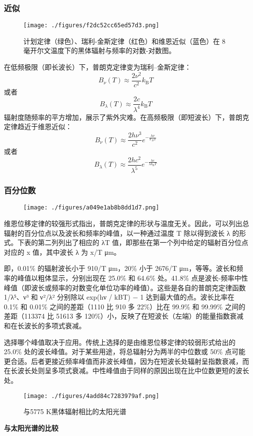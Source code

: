 \subsubsection{近似}
\begin{figure}[ht]
\centering
\texttt{[image: ./figures/f2dc52cc65ed57d3.png]}
\caption{计划定律（绿色）、瑞利-金斯定律（红色）和维恩近似（蓝色）在 8 毫开尔文温度下的黑体辐射与频率的对数-对数图。} \label{fig_HTFS_6}
\end{figure}
在低频极限（即长波长）下，普朗克定律变为瑞利–金斯定律：
\[
B_\nu (T) \approx \frac{2 \nu^2}{c^2} k_{\mathrm{B}} T~
\]
或者
\[
B_\lambda (T) \approx \frac{2c}{\lambda^4} k_{\mathrm{B}} T~
\]
辐射度随频率的平方增加，展示了紫外灾难。在高频极限（即短波长）下，普朗克定律趋近于维恩近似：
\[
B_\nu (T) \approx \frac{2 h \nu^3}{c^2} e^{-\frac{h\nu}{k_{\mathrm~{B}} T}}~
\]
或者
\[
B_\lambda (T) \approx \frac{2 h c^2}{\lambda^5} e^{-\frac{hc}{\lambda k_{\mathrm{B}} T}}~
\]
\subsubsection{百分位数}
\begin{figure}[ht]
\centering
\texttt{[image: ./figures/a049e1ab8b8dd1d7.png]}
\caption{} \label{fig_HTFS_7}
\end{figure}
维恩位移定律的较强形式指出，普朗克定律的形状与温度无关。因此，可以列出总辐射的百分位点以及波长和频率的峰值，以一种通过温度 T 除以得到波长 λ 的形式。下表的第二列列出了相应的 λT 值，即那些在第一个列中给定的辐射百分位点对应的 x 值，其中波长 λ 为 ⁠x/T μm。

即，0.01\% 的辐射波长小于 ⁠910/T μm，20\% 小于 ⁠2676/T μm，等等。波长和频率的峰值以粗体显示，分别出现在 25.0\% 和 64.6\% 处。41.8\% 点是波长-频率中性峰值（即波长或频率的对数变化单位功率的峰值）。这些是各自的普朗克定律函数 ⁠1/λ⁵、ν³ 和 ⁠ν²/λ² 分别除以 exp(⁠hν / kBT⁠) − 1 达到最大值的点。波长比率在 0.1\% 和 0.01\% 之间的差距（1110 比 910 多 22\%）比在 99.9\% 和 99.99\% 之间的差距（113374 比 51613 多 120\%）小，反映了在短波长（左端）的能量指数衰减和在长波长的多项式衰减。

选择哪个峰值取决于应用。传统上选择的是由维恩位移定律的较弱形式给出的 25.0\% 处的波长峰值。对于某些用途，将总辐射分为两半的中位数或 50\% 点可能更合适。后者更接近频率峰值而非波长峰值，因为在短波长处辐射呈指数衰减，而在长波长处则呈多项式衰减。中性峰值由于同样的原因出现在比中位数更短的波长处。
\begin{figure}[ht]
\centering
\texttt{[image: ./figures/4add84c7283979af.png]}
\caption{与5775 K黑体辐射相比的太阳光谱} \label{fig_HTFS_8}
\end{figure}
\textbf{与太阳光谱的比较}  

